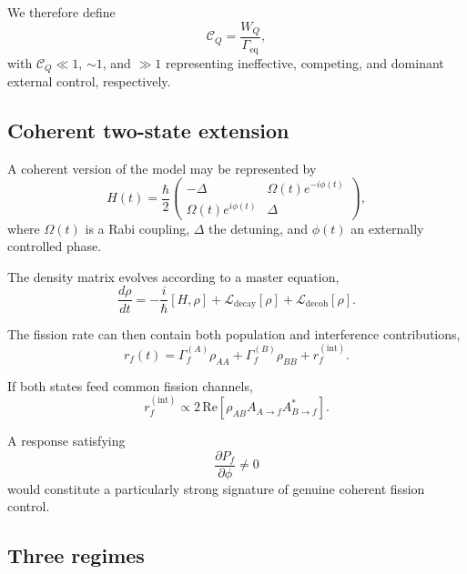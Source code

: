 We therefore define
\begin{equation}
\mathcal{C}_Q
=
\frac{W_Q}{\Gamma_{\mathrm{eq}}},
\end{equation}
with $\mathcal{C}_Q\ll1$, $\sim1$, and $\gg1$ representing ineffective, competing, and dominant external control, respectively.

\subsection{Coherent two-state extension}

A coherent version of the model may be represented by
\begin{equation}
H(t)
=
\frac{\hbar}{2}
\begin{pmatrix}
-\Delta &
\Omega(t)e^{-i\phi(t)}
\\
\Omega(t)e^{i\phi(t)} &
\Delta
\end{pmatrix},
\end{equation}
where $\Omega(t)$ is a Rabi coupling, $\Delta$ the detuning, and $\phi(t)$ an externally controlled phase.

The density matrix evolves according to a master equation,
\begin{equation}
\frac{d\rho}{dt}
=
-\frac{i}{\hbar}[H,\rho]
+
\mathcal{L}_{\mathrm{decay}}[\rho]
+
\mathcal{L}_{\mathrm{decoh}}[\rho].
\end{equation}

The fission rate can then contain both population and interference contributions,
\begin{equation}
r_f(t)
=
\Gamma_f^{(A)}\rho_{AA}
+
\Gamma_f^{(B)}\rho_{BB}
+
r_f^{(\mathrm{int})}.
\end{equation}

If both states feed common fission channels,
\begin{equation}
r_f^{(\mathrm{int})}
\propto
2\,\mathrm{Re}
\left[
\rho_{AB}
A_{A\rightarrow f}
A_{B\rightarrow f}^{\ast}
\right].
\end{equation}

A response satisfying
\begin{equation}
\frac{\partial P_f}{\partial\phi}\neq0
\end{equation}
would constitute a particularly strong signature of genuine coherent fission control.

\subsection{Three regimes}

